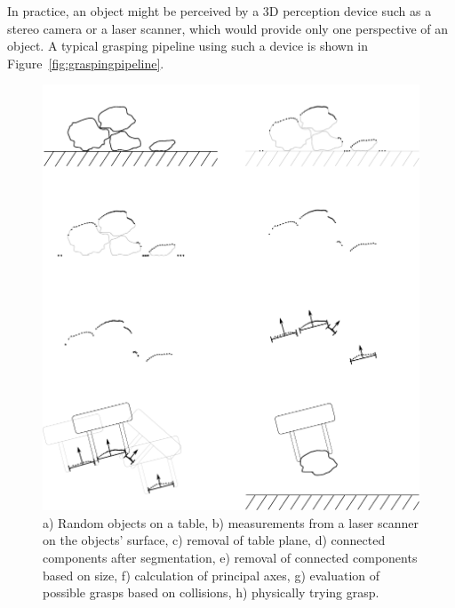 In practice, an object might be perceived by a 3D perception device such as a stereo camera or a laser scanner, which would provide only one perspective of an object. A typical grasping pipeline using such a device is shown in Figure~\ref{fig:graspingpipeline}. 

\begin{figure}
\includegraphics[width=\columnwidth]{figs/graspingpointcloud}
\caption{a) Random objects on a table, b) measurements from a laser scanner on the objects' surface, c) removal of table plane, d) connected components after segmentation, e) removal of connected components based on size, f) calculation of principal axes, g) evaluation of possible grasps based on collisions, h) physically trying grasp.\label{fig:graspalgorithm}} 
\end{figure}

